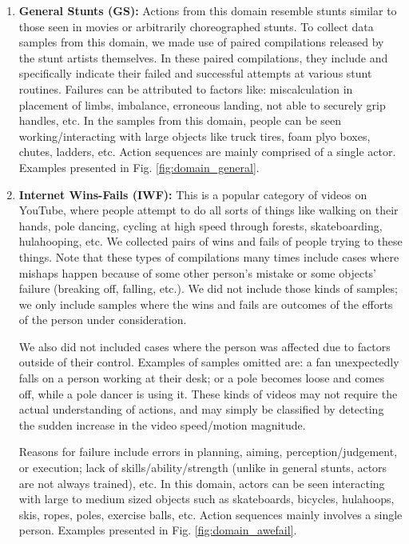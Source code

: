 \documentclass[final]{cvpr}
\begin{document}
\begin{enumerate}
\item{\textbf{General Stunts (GS):}}
Actions from this domain resemble stunts similar to those seen in movies or arbitrarily choreographed stunts. To collect data samples from this domain, we made use of paired compilations released by the stunt artists themselves. In these paired compilations, they include and specifically indicate their failed and successful attempts at various stunt routines. Failures can be attributed to factors like: miscalculation in placement of limbs, imbalance, erroneous landing, not able to securely grip handles, etc. In the samples from this domain, people can be seen working/interacting with large objects like truck tires, foam plyo boxes, chutes, ladders, etc. Action sequences are mainly comprised of a single actor. Examples presented in Fig. \ref{fig:domain_general}.

\item{\textbf{Internet Wins-Fails (IWF):}}
This is a popular category of videos on YouTube, where people attempt to do all sorts of things like walking on their hands, pole dancing, cycling at high speed through forests, skateboarding, hulahooping, etc. We collected pairs of wins and fails of people trying to these things. Note that these types of compilations many times include cases where mishaps happen because of some other person's mistake or some objects' failure (breaking off, falling, etc.). We did not include those kinds of samples; we only include samples where the wins and fails are outcomes of the efforts of the person under consideration. 

We also did not included cases where the person was affected due to factors outside of their control. Examples of samples omitted are: a fan unexpectedly falls on a person working at their desk; or a pole becomes loose and comes off, while a pole dancer is using it. These kinds of videos may not require the actual understanding of actions, and may simply be classified by detecting the sudden increase in the video speed/motion magnitude.

Reasons for failure include errors in planning, aiming, perception/judgement, or execution; lack of skills/ability/strength (unlike in general stunts, actors are not always trained), etc. In this domain, actors can be seen interacting with large to medium sized objects such as skateboards, bicycles, hulahoops, skis, ropes, poles, exercise balls, etc. Action sequences mainly involves a single person. Examples presented in Fig. \ref{fig:domain_awefail}.


\end{enumerate}
\end{document}
